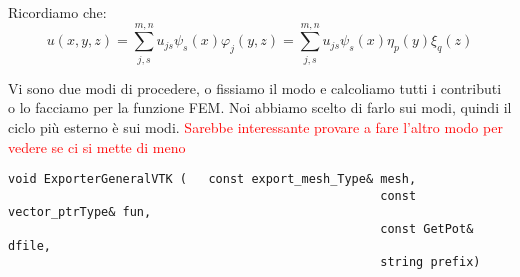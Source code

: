 Ricordiamo che:
\begin{equation}
u(x,y,z) = \sum_{j,s}^{m,n}u_{js}\psi_s(x)\varphi_j(y,z) = \sum_{j,s}^{m,n}u_{js}\psi_s(x)\eta_p(y)\xi_q(z)
\end{equation}

Vi sono due modi di procedere, o fissiamo il modo e calcoliamo tutti i contributi o lo facciamo per la funzione FEM.
Noi abbiamo scelto di farlo sui modi, quindi il ciclo pi\`u esterno \`e sui modi.
\textcolor{red}{Sarebbe interessante provare a fare l'altro modo per vedere se ci si mette di meno}

\begin{lstlisting}[style = general]
void ExporterGeneralVTK (	const export_mesh_Type& mesh,
													const vector_ptrType& fun,
													const GetPot& dfile,
													string prefix)
\end{lstlisting}


